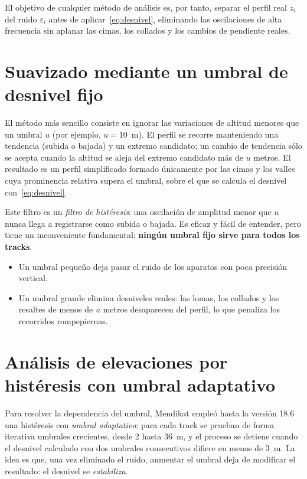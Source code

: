 \documentclass[11pt,a4paper]{article}
\begin{document}
El objetivo de cualquier método de análisis es, por tanto, separar el perfil
real $z_i$ del ruido $\varepsilon_i$ antes de aplicar~\eqref{eq:desnivel},
eliminando las oscilaciones de alta frecuencia sin aplanar las cimas, los
collados y los cambios de pendiente reales.

\section{Suavizado mediante un umbral de desnivel fijo}

El método más sencillo consiste en ignorar las variaciones de altitud menores
que un umbral $u$ (por ejemplo, $u = 10$~m). El perfil se recorre manteniendo
una tendencia (subida o bajada) y un extremo candidato; un cambio de tendencia
sólo se acepta cuando la altitud se aleja del extremo candidato más de $u$
metros. El resultado es un perfil simplificado formado únicamente por las cimas
y los valles cuya prominencia relativa supera el umbral, sobre el que se
calcula el desnivel con~\eqref{eq:desnivel}.

Este filtro es un \emph{filtro de histéresis}: una oscilación de amplitud menor
que $u$ nunca llega a registrarse como subida o bajada. Es eficaz y fácil de
entender, pero tiene un inconveniente fundamental: \textbf{ningún umbral fijo
sirve para todos los tracks}.
\begin{itemize}
    \item Un umbral pequeño deja pasar el ruido de los aparatos con poca
          precisión vertical.
    \item Un umbral grande elimina desniveles reales: las lomas, los
          collados y los resaltes de menos de $u$ metros desaparecen del
          perfil, lo que penaliza los recorridos rompepiernas.
\end{itemize}

\section{Análisis de elevaciones por histéresis con umbral adaptativo}

Para resolver la dependencia del umbral, Mendikat empleó hasta la versión 18.6
una histéresis con \emph{umbral adaptativo}: para cada track se prueban de
forma iterativa umbrales crecientes, desde 2 hasta 36~m, y el proceso se
detiene cuando el desnivel calculado con dos umbrales consecutivos difiere en
menos de 3~m. La idea es que, una vez eliminado el ruido, aumentar el umbral
deja de modificar el resultado: el desnivel se \emph{estabiliza}.
\end{document}
